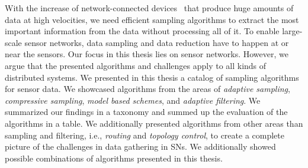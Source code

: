 With the increase of network-connected devices~\cite{gartner} that produce huge
amounts of data at high velocities, we need efficient sampling algorithms to
extract the most important information from the data without processing all of
it. To enable large-scale sensor networks, data sampling and data reduction
have to happen at or near the sensors. Our focus in this thesis lies on sensor
networks. However, we argue that the presented algorithms and challenges apply
to all kinds of distributed systems. We presented in this thesis a catalog of
sampling algorithms for sensor data. We showcased algorithms from the areas of
\textit{adaptive sampling}, \textit{compressive sampling}, \textit{model based
schemes}, and \textit{adaptive filtering}. We summarized our findings in a
taxonomy and summed up the evaluation of the algorithms in a table. We
additionally presented algorithms from other areas than sampling and filtering,
i.e., \textit{routing} and \textit{topology control}, to create a complete
picture of the challenges in data gathering in \acp{SN}. We additionally showed
possible combinations of algorithms presented in this thesis.